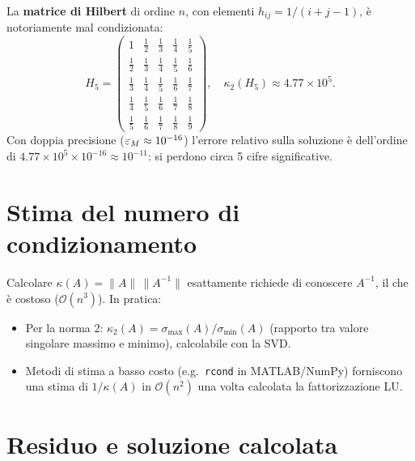 \begin{example}
La \textbf{matrice di Hilbert} di ordine $n$, con elementi $h_{ij} = 1/(i+j-1)$,
è notoriamente mal condizionata:
\[
  H_5 = \begin{pmatrix}
    1 & \frac{1}{2} & \frac{1}{3} & \frac{1}{4} & \frac{1}{5} \\[4pt]
    \frac{1}{2} & \frac{1}{3} & \frac{1}{4} & \frac{1}{5} & \frac{1}{6} \\[4pt]
    \frac{1}{3} & \frac{1}{4} & \frac{1}{5} & \frac{1}{6} & \frac{1}{7} \\[4pt]
    \frac{1}{4} & \frac{1}{5} & \frac{1}{6} & \frac{1}{7} & \frac{1}{8} \\[4pt]
    \frac{1}{5} & \frac{1}{6} & \frac{1}{7} & \frac{1}{8} & \frac{1}{9}
  \end{pmatrix}, \quad \kappa_2(H_5) \approx 4.77 \times 10^5.
\]
Con doppia precisione ($\varepsilon_M \approx 10^{-16}$) l'errore relativo sulla soluzione
è dell'ordine di $4.77 \times 10^5 \times 10^{-16} \approx 10^{-11}$: si perdono
circa 5 cifre significative.
\end{example}

\section{Stima del numero di condizionamento}
\label{sec:stima_cond}

Calcolare $\kappa(A) = \|A\|\,\|A^{-1}\|$ esattamente richiede di conoscere $A^{-1}$,
il che è costoso ($\mathcal{O}(n^3)$). In pratica:
\begin{itemize}
  \item Per la norma 2: $\kappa_2(A) = \sigma_{\max}(A)/\sigma_{\min}(A)$
        (rapporto tra valore singolare massimo e minimo), calcolabile con la SVD.
  \item Metodi di stima a basso costo (e.g.\ \texttt{rcond} in MATLAB/NumPy)
        forniscono una stima di $1/\kappa(A)$ in $\mathcal{O}(n^2)$ una volta
        calcolata la fattorizzazione LU.
\end{itemize}

\section{Residuo e soluzione calcolata}
\label{sec:residuo}

